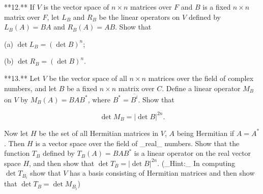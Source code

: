 **12.** If \(V\) is the vector space of \(n\times n\) matrices over \(F\) and \(B\) is a fixed \(n\times n\) matrix over \(F\), let \(L_{B}\) and \(R_{B}\) be the linear operators on \(V\) defined by \(L_{B}(A)=BA\) and \(R_{B}(A)=AB\). Show that

(a) \(\det L_{B}=(\det B)^{n}\);

(b) \(\det R_{B}=(\det B)^{n}\).

**13.** Let \(V\) be the vector space of all \(n\times n\) matrices over the field of complex numbers, and let \(B\) be a fixed \(n\times n\) matrix over \(C\). Define a linear operator \(M_{B}\) on \(V\) by \(M_{B}(A)=BAB^{*}\), where \(B^{*}=\overline{B^{i}}\). Show that

\[\det M_{B}=|\det B|^{2n}.\]

Now let \(H\) be the set of all Hermitian matrices in \(V\), \(A\) being Hermitian if \(A=A^{*}\). Then \(H\) is a vector space over the field of _real_ numbers. Show that the function \(T_{B}\) defined by \(T_{B}(A)=BAB^{*}\) is a linear operator on the real vector space \(H\), and then show that \(\det T_{B}=|\det B|^{2n}\). (_Hint:_ In computing \(\det T_{B_{i}}\) show that \(V\) has a basis consisting of Hermitian matrices and then show that \(\det T_{B}=\det M_{B_{i}}\))